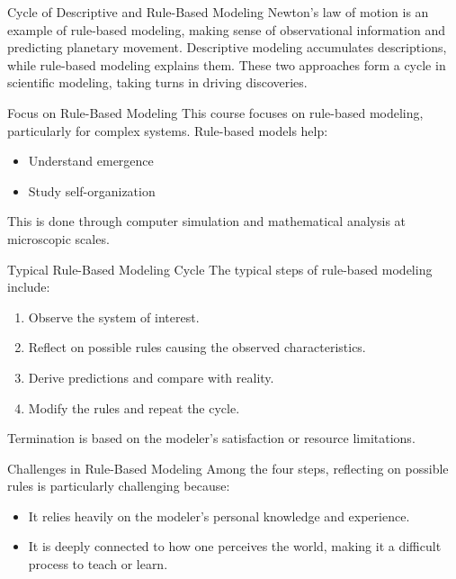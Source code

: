 \documentclass{beamer}
\begin{document}
\begin{frame}{Cycle of Descriptive and Rule-Based Modeling}
    Newton's law of motion is an example of rule-based modeling, making sense of observational information and predicting planetary movement.
    \newline
    Descriptive modeling accumulates descriptions, while rule-based modeling explains them. These two approaches form a cycle in scientific modeling, taking turns in driving discoveries.
\end{frame}

\begin{frame}{Focus on Rule-Based Modeling}
    This course focuses on rule-based modeling, particularly for complex systems. Rule-based models help:
    \begin{itemize}
        \item Understand emergence
        \item Study self-organization
    \end{itemize}
    This is done through computer simulation and mathematical analysis at microscopic scales.
\end{frame}

\begin{frame}{Typical Rule-Based Modeling Cycle}
    The typical steps of rule-based modeling include:
    \begin{enumerate}
        \item Observe the system of interest.
        \item Reflect on possible rules causing the observed characteristics.
        \item Derive predictions and compare with reality.
        \item Modify the rules and repeat the cycle.
    \end{enumerate}
    Termination is based on the modeler's satisfaction or resource limitations.
\end{frame}

\begin{frame}{Challenges in Rule-Based Modeling}
    Among the four steps, reflecting on possible rules is particularly challenging because:
    \begin{itemize}
        \item It relies heavily on the modeler's personal knowledge and experience.
        \item It is deeply connected to how one perceives the world, making it a difficult process to teach or learn.
    \end{itemize}
\end{frame}
\end{document}
